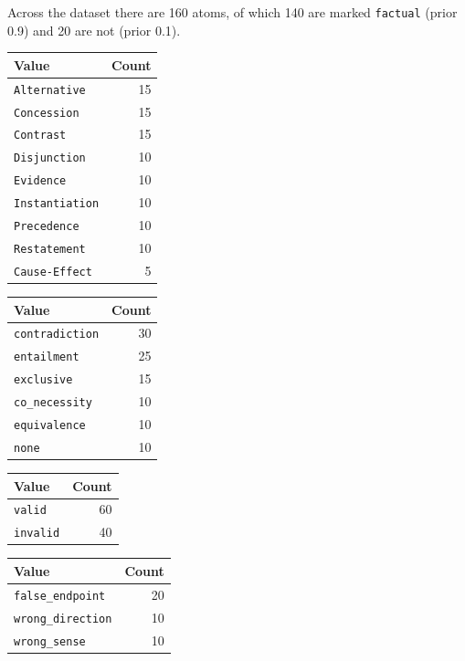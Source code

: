 \documentclass[11pt]{article}
\begin{document}
Across the dataset there are 160 atoms, of which 140 are marked \texttt{factual} (prior 0.9) and 20 are not (prior 0.1).

\begin{minipage}[t]{0.48\linewidth}
\centering
\small
{}
\label{tab:senses}
\begin{tabular}{lr}
\toprule
Value & Count \\
\midrule
\texttt{Alternative} & 15 \\
\texttt{Concession} & 15 \\
\texttt{Contrast} & 15 \\
\texttt{Disjunction} & 10 \\
\texttt{Evidence} & 10 \\
\texttt{Instantiation} & 10 \\
\texttt{Precedence} & 10 \\
\texttt{Restatement} & 10 \\
\texttt{Cause-Effect} & 5 \\
\bottomrule
\end{tabular}
\end{minipage}\hfill\begin{minipage}[t]{0.48\linewidth}
\centering
\small
{}
\label{tab:couplings}
\begin{tabular}{lr}
\toprule
Value & Count \\
\midrule
\texttt{contradiction} & 30 \\
\texttt{entailment} & 25 \\
\texttt{exclusive} & 15 \\
\texttt{co\_necessity} & 10 \\
\texttt{equivalence} & 10 \\
\texttt{none} & 10 \\
\bottomrule
\end{tabular}
\end{minipage}

\bigskip
\begin{minipage}[t]{0.48\linewidth}
\centering
\small
{}
\label{tab:validity}
\begin{tabular}{lr}
\toprule
Value & Count \\
\midrule
\texttt{valid} & 60 \\
\texttt{invalid} & 40 \\
\bottomrule
\end{tabular}
\end{minipage}\hfill\begin{minipage}[t]{0.48\linewidth}
\centering
\small
{}
\label{tab:errorkinds}
\begin{tabular}{lr}
\toprule
Value & Count \\
\midrule
\texttt{false\_endpoint} & 20 \\
\texttt{wrong\_direction} & 10 \\
\texttt{wrong\_sense} & 10 \\
\bottomrule
\end{tabular}
\end{minipage}
\end{document}
